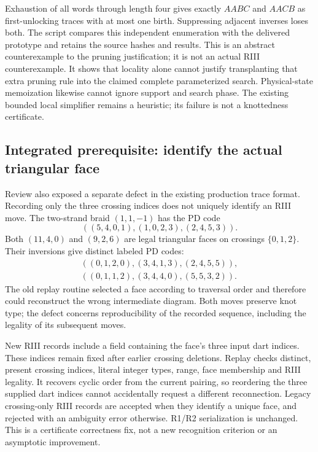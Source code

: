 Exhaustion of all words through length four gives exactly $AABC$ and
$AACB$ as first-unlocking traces with at most one birth.  Suppressing
adjacent inverses loses both.  The script
 compares this independent enumeration
with the delivered prototype and retains the source hashes and results.
This is an abstract counterexample to the pruning justification; it is
not an actual RIII counterexample.  It shows that locality alone cannot
justify transplanting that extra pruning rule into the claimed complete
parameterized search.  Physical-state memoization likewise cannot ignore
support and search phase.  The existing bounded local simplifier remains
a heuristic; its failure is not a knottedness certificate.

\subsection{Integrated prerequisite: identify the actual triangular face}
Review also exposed a separate defect in the existing production trace
format.  Recording only the three crossing indices does not uniquely
identify an RIII move.  The two-strand braid $(1,1,-1)$ has the PD code
\[
 ((5,4,0,1),(1,0,2,3),(2,4,5,3)).
\]
Both $(11,4,0)$ and $(9,2,6)$ are legal triangular faces on crossings
$\{0,1,2\}$.  Their inversions give distinct labeled PD codes:
\[
\begin{split}
 ((0,1,2,0),(3,4,1,3),(2,4,5,5)),\\
 ((0,1,1,2),(3,4,4,0),(5,5,3,2)).
\end{split}
\]
The old replay routine selected a face according to traversal order and
therefore could reconstruct the wrong intermediate diagram.  Both moves
preserve knot type; the defect concerns reproducibility of the recorded
sequence, including the legality of its subsequent moves.

New RIII records include a  field containing the face's
three input dart indices.  These indices remain fixed after earlier
crossing deletions.  Replay checks distinct, present crossing indices,
literal integer types, range, face membership and RIII legality.  It
recovers cyclic order from the current pairing, so reordering the three
supplied dart indices cannot accidentally request a different reconnection.
Legacy crossing-only RIII records are accepted when they identify a unique
face, and rejected with an ambiguity error otherwise.  R1/R2 serialization
is unchanged.  This is a certificate correctness fix, not a new recognition
criterion or an asymptotic improvement.

